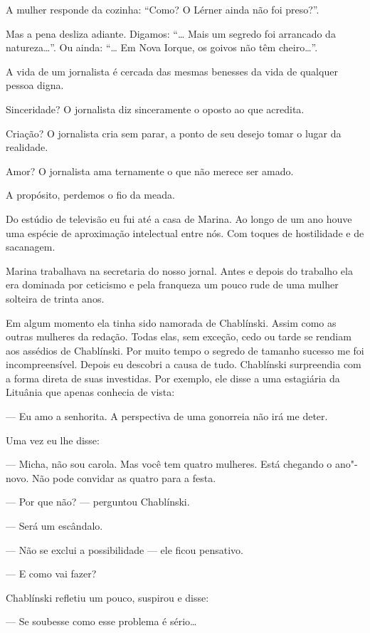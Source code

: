 A mulher responde da cozinha: ``Como? O Lérner ainda não foi preso?''.

Mas a pena desliza adiante. Digamos: ``\ldots{} Mais um segredo foi arrancado
da natureza\ldots{}''. Ou ainda: ``\ldots{} Em Nova Iorque, os goivos não têm
cheiro\ldots{}''.

A vida de um jornalista é cercada das mesmas benesses da vida de
qualquer pessoa digna.

Sinceridade? O jornalista diz sinceramente o oposto ao que acredita.

Criação? O jornalista cria sem parar, a ponto de seu desejo tomar o
lugar da realidade.

Amor? O jornalista ama ternamente o que não merece ser amado.

A propósito, perdemos o fio da meada.

Do estúdio de televisão eu fui até a casa de Marina. Ao longo de um ano
houve uma espécie de aproximação intelectual entre nós. Com toques de
hostilidade e de sacanagem.

Marina trabalhava na secretaria do nosso jornal. Antes e depois do
trabalho ela era dominada por ceticismo e pela franqueza um pouco rude
de uma mulher solteira de trinta anos.

Em algum momento ela tinha sido namorada de Chablínski. Assim como as
outras mulheres da redação. Todas elas, sem exceção, cedo ou tarde se
rendiam aos assédios de Chablínski. Por muito tempo o segredo de tamanho
sucesso me foi incompreensível. Depois eu descobri a causa de tudo.
Chablínski surpreendia com a forma direta de suas investidas. Por
exemplo, ele disse a uma estagiária da Lituânia que apenas conhecia de
vista:

--- Eu amo a senhorita. A perspectiva de uma gonorreia não irá me deter.

Uma vez eu lhe disse:

--- Micha, não sou carola. Mas você tem quatro mulheres. Está chegando o
ano"-novo. Não pode convidar as quatro para a festa.

--- Por que não? --- perguntou Chablínski.

--- Será um escândalo.

--- Não se exclui a possibilidade --- ele ficou pensativo.

--- E como vai fazer?

Chablínski refletiu um pouco, suspirou e disse:

--- Se soubesse como esse problema é sério\ldots{}

